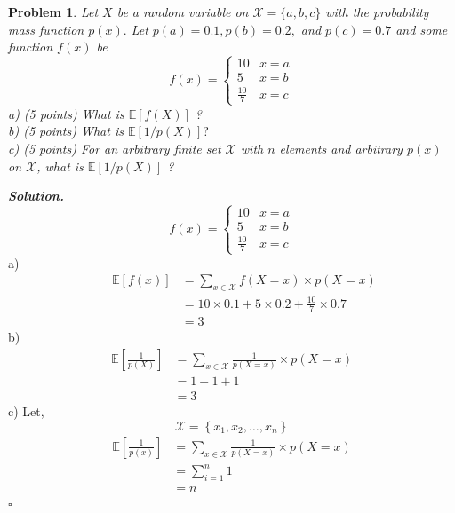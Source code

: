 \documentclass[12pt]{article}
\newtheorem{problem}{Problem}
\newenvironment{solution}[1][\it{Solution}]{\textbf{#1. } }{$\square$}
\begin{document}
\begin{problem}
Let $X$ be a random variable on $\mathcal{X}=\{a, b, c\}$ with the probability mass function $p(x) .$ Let $p(a)=0.1, p(b)=0.2,$ and $p(c)=0.7$ and some function $f(x)$ be
$$
f(x)=\left\{\begin{array}{ll}
10 & x=a \\
5 & x=b \\
\frac{10}{7} & x=c
\end{array}\right.
$$
a) (5 points) What is $\mathbb{E}[f(X)]$ ?\\
b) (5 points) What is $\mathbb{E}[1 / p(X)] ?$\\
c) (5 points) For an arbitrary finite set $\mathcal{X}$ with $n$ elements and arbitrary $p(x)$ on $\mathcal{X}$, what is $\mathbb{E}[1 / p(X)]$ ?
\end{problem}
\begin{solution}
$$
f(x)=\left\{\begin{array}{ll}
10 & x=a \\
5 & x=b \\
\frac{10}{7} & x=c
\end{array}\right.
$$
a)
\begin{align*}
\qquad \mathbb{E}[f(x)] & =\sum_{x \in \mathcal{X}} f(X=x) \times p(X=x) \\
& = 10 \times 0.1+5 \times 0.2+\frac{10}{7} \times 0.7 \\
& = \boxed{3}
\end{align*}
b)
\begin{align*}
\mathbb{E}\left[\frac{1}{p(X)}\right] &=\sum_{x \in \mathcal{X}} \frac{1}{p(X=x)} \times p(X = x) \\
&=1+1+1 \\
&=\boxed{3}
\end{align*}
c)
Let, 
$$
\mathcal{X} = \left\{x_{1}, x_{2}, \ldots, x_{n}\right\}
$$
\begin{align*}
\mathbb{E}\left[\frac{1}{p(x)}\right] &=\sum_{x \in \mathcal{X}} \frac{1}{p(X=x)} \times p(X=x) \\
&=\sum_{i=1}^{n} 1 \\
&=\boxed{n}
\end{align*}
\end{solution}
\end{document}
